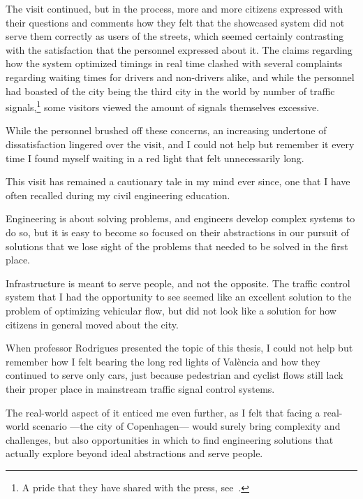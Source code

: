 The visit continued, but in the process, more and more citizens expressed with their questions and comments how they felt that the showcased system did not serve them correctly as users of the streets, which seemed certainly contrasting with the satisfaction that the personnel expressed about it. The claims regarding how the system optimized timings in real time clashed with several complaints regarding waiting times for drivers and non-drivers alike, and while the personnel had boasted of the city being the third city in the world by number of traffic signals,\footnote{A pride that they have shared with the press, see~\cite{cadenaser}.} some visitors viewed the amount of signals themselves excessive.

While the personnel brushed off these concerns, an increasing undertone of dissatisfaction lingered over the visit, and I could not help but remember it every time I found myself waiting in a red light that felt unnecessarily long.

\medskip

\noindent This visit has remained a cautionary tale in my mind ever since, one that I have often recalled during my civil engineering education.

Engineering is about solving problems, and engineers develop complex systems to do so, but it is easy to become so focused on their abstractions in our pursuit of solutions that we lose sight of the problems that needed to be solved in the first place.

Infrastructure is meant to serve people, and not the opposite. The traffic control system that I had the opportunity to see seemed like an excellent solution to the problem of optimizing vehicular flow, but did not look like a solution for how citizens in general moved about the city.

When professor Rodrigues presented the topic of this thesis, I could not help but remember how I felt bearing the long red lights of València and how they continued to serve only cars, just because pedestrian and cyclist flows still lack their proper place in mainstream traffic signal control systems.

The real-world aspect of it enticed me even further, as I felt that facing a real-world scenario —the city of Copenhagen— would surely bring complexity and challenges, but also opportunities in which to find engineering solutions that actually explore beyond ideal abstractions and serve people.

\medskip

